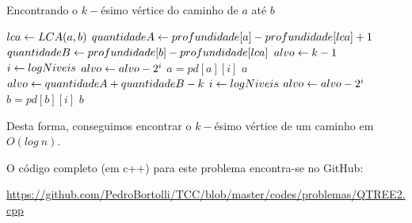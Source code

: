 \begin{algorithm}[H]
\caption{Encontrando o $k-$ésimo vértice do caminho de $a$ até $b$}
\begin{algorithmic}[1]
    \State $lca \leftarrow LCA(a, b)$
    \State $quantidadeA \leftarrow profundidade[a] - profundidade[lca] + 1$
    \State $quantidadeB \leftarrow profundidade[b] - profundidade[lca]$
        \State $alvo \leftarrow k - 1$
        \State $i \leftarrow logNiveis$
                \State $alvo \leftarrow alvo - 2^i$
                \State $a = pd[a][i]$
            \EndIf
        \EndWhile
        \Return $a$
    \Else
        \State $alvo \leftarrow quantidadeA + quantidadeB - k$
        \State $i \leftarrow logNiveis$
                \State $alvo \leftarrow alvo - 2^i$
                \State $b = pd[b][i]$
            \EndIf
        \EndWhile
        \Return $b$
    \EndIf
\EndFunction
\end{algorithmic}
\end{algorithm}

Desta forma, conseguimos encontrar o $k-$ésimo vértice de um caminho em $O(log\ n)$.

\vspace{0.5cm}

O código completo (em c++) para este problema encontra-se no GitHub:

\url{https://github.com/PedroBortolli/TCC/blob/master/codes/problemas/QTREE2.cpp}

\vspace{0.3cm}
